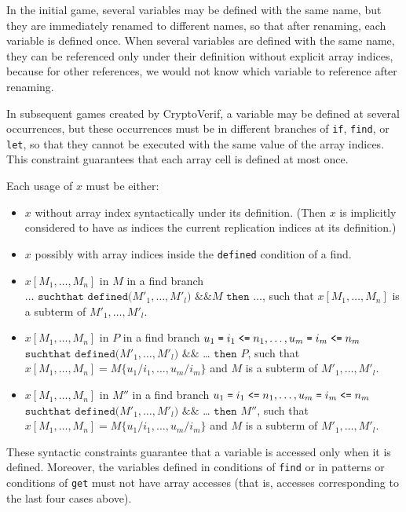 In the initial game, several variables may be defined with the same
name, but they are immediately renamed to different names, so that
after renaming, each variable is defined once.  When several variables
are defined with the same name, they can be referenced only under
their definition without explicit array indices, because for other
references, we would not know which variable to reference after
renaming.

In subsequent games created by CryptoVerif, a variable may be defined
at several occurrences, but these occurrences must be in different
branches of \texttt{if}, \texttt{find}, or \texttt{let}, so that
they cannot be executed with the same value of the array indices.
This constraint guarantees that each array cell is defined at most once.

Each usage of $x$ must be either:
\begin{itemize}

\item $x$ without array index syntactically under its definition.
(Then $x$ is implicitly considered to have as indices the current
replication indices at its definition.)

\item $x$ possibly with array indices inside the \texttt{defined}
condition of a find.

\item $x[M_1, \ldots, M_n]$ in $M$  in a find branch
$\ldots\texttt{ suchthat defined(}M'_1, \ldots, M'_l\texttt{) \&\& }M
\texttt{ then }\ldots$, such that $x[M_1, \ldots, M_n]$
is a subterm of $M'_1, \ldots, M'_l$. 

\item $x[M_1, \ldots, M_n]$ in $P$  in a find branch
$u_1 \mathrel{\texttt{=}}  i_1 \mathrel{\texttt{<=}}  n_1, \ldots, u_m \mathrel{\texttt{=}}  i_m \mathrel{\texttt{<=}}  n_m$ $\texttt{suchthat}$ $\texttt{defined(}M'_1, \allowbreak \ldots, \allowbreak M'_l\texttt{)}$ $\texttt{\&\&}$ \ldots
$\texttt{then }P$, such that $x[M_1, \ldots, M_n] = M\{u_1/i_1,\dots,u_m/i_m\}$
and $M$ is a subterm of $M'_1, \ldots, M'_l$. 

\item $x[M_1, \ldots, M_n]$ in $M''$ in a find branch
$u_1 \mathrel{\texttt{=}}  i_1 \mathrel{\texttt{<=}}  n_1, \ldots, u_m \mathrel{\texttt{=}}  i_m \mathrel{\texttt{<=}}  n_m$ $\texttt{suchthat}$ $\texttt{defined(}M'_1, \allowbreak \ldots, \allowbreak M'_l\texttt{)}$ $\texttt{\&\&}$ \ldots
$\texttt{then }M''$, such that $x[M_1, \ldots, M_n] = M\{u_1/i_1,\dots,u_m/i_m\}$
and $M$ is a subterm of $M'_1, \ldots, M'_l$. 

\end{itemize}
These syntactic constraints guarantee that a variable is accessed
only when it is defined. Moreover, the variables defined in
conditions of {\tt find} or in patterns or conditions of {\tt get}
must not have array accesses (that is, accesses corresponding to the
last four cases above).

